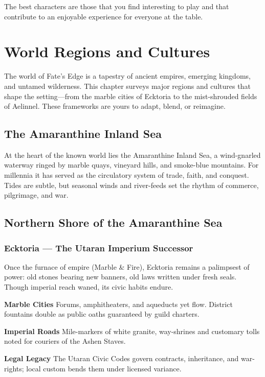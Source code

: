 \documentclass[11pt,twoside,openany]{book}
\begin{document}
The best characters are those that you find interesting to play and that contribute to an enjoyable experience for everyone at the table.

\chapter{World Regions and Cultures} \label{ch:regions}

The world of Fate's Edge is a tapestry of ancient empires, emerging kingdoms, and untamed wilderness. This chapter surveys major regions and cultures that shape the setting---from the marble cities of Ecktoria to the mist-shrouded fields of Aelinnel. These frameworks are yours to adapt, blend, or reimagine.

\section*{The Amaranthine Inland Sea} 

At the heart of the known world lies the Amaranthine Inland Sea, a wind-gnarled waterway ringed by marble quays, vineyard hills, and smoke-blue mountains. For millennia it has served as the circulatory system of trade, faith, and conquest. Tides are subtle, but seasonal winds and river-feeds set the rhythm of commerce, pilgrimage, and war.

\section*{Northern Shore of the Amaranthine Sea} 

\subsection*{Ecktoria --- The Utaran Imperium Successor}

Once the furnace of empire (Marble \& Fire), Ecktoria remains a palimpsest of power: old stones bearing new banners, old laws written under fresh seals. Though imperial reach waned, its civic habits endure.

\textbf{Marble Cities} Forums, amphitheaters, and aqueducts yet flow. District fountains double as public oaths guaranteed by guild charters.

\textbf{Imperial Roads} Mile-markers of white granite, way-shrines and customary tolls noted for couriers of the Ashen Staves.

\textbf{Legal Legacy} The Utaran Civic Codes govern contracts, inheritance, and war-rights; local custom bends them under licensed variance.
\end{document}
